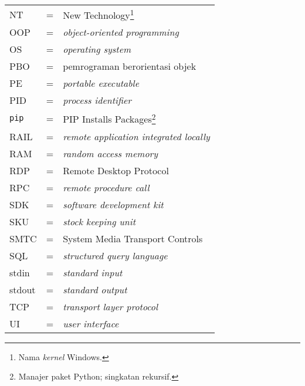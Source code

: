 \begin{longtable}{llp{3in}}
    NT & \hspace{1.5cm} = & New Technology\footnote{Nama \textit{kernel} Windows.}\\
    OOP & \hspace{1.5cm} = & \textit{object-oriented programming}\\
    OS & \hspace{1.5cm} = & \textit{operating system}\\
    PBO & \hspace{1.5cm} = & pemrograman berorientasi objek\\
    PE & \hspace{1.5cm} = & \textit{portable executable}\\
    PID & \hspace{1.5cm} = & \textit{process identifier}\\
    \verb|pip| & \hspace{1.5cm} = & PIP Installs Packages\footnote{Manajer paket Python; singkatan rekursif.}\\
    RAIL & \hspace{1.5cm} = & \textit{remote application integrated locally}\\
    RAM & \hspace{1.5cm} = & \textit{random access memory}\\
    RDP & \hspace{1.5cm} = & Remote Desktop Protocol\\
    RPC & \hspace{1.5cm} = & \textit{remote procedure call}\\
    SDK & \hspace{1.5cm} = & \textit{software development kit}\\
    SKU & \hspace{1.5cm} = & \textit{stock keeping unit}\\
    SMTC & \hspace {1.5cm} = & System Media Transport Controls\\
    SQL & \hspace{1.5cm} = & \textit{structured query language}\\
    stdin & \hspace{1.5cm} = & \textit{standard input}\\
    stdout & \hspace{1.5cm} = & \textit{standard output}\\
    TCP & \hspace{1.5cm} = & \textit{transport layer protocol}\\
    UI & \hspace{1.5cm} = & \textit{user interface}\\

\end{longtable}
